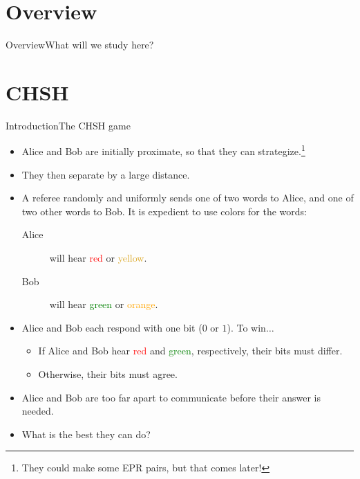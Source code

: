 
\section*{Overview}

\begin{frame}{Overview}{What will we study here?}
\end{frame}

\section*{CHSH}

{%
\def\RD#1{\textcolor{red}{#1}}
\def\YL#1{\textcolor{Goldenrod}{#1}}
\def\GN#1{\textcolor{green}{#1}}
\def\OR#1{\textcolor{orange}{#1}}
\begin{frame}{Introduction}{The CHSH game}
    \begin{itemize}[<+->]
        \item Alice and Bob are initially proximate, so that they can strategize.\footnote{They could make some EPR pairs, but that comes later!}
        \item They then separate by a large distance.
        \item A referee randomly and uniformly sends one of two words to Alice, and one of two other words to Bob.  It is expedient to use colors for the words:
        \begin{description}
            \item[Alice] will hear \RD{red} or \YL{yellow}.
            \item[Bob] will hear \GN{green} or \OR{orange}.
        \end{description}
    \item Alice and Bob each respond with one bit ($0$ or $1$).  To win$\ldots$
    \begin{itemize}
        \item If Alice and Bob hear \RD{red} and \GN{green}, respectively, their bits must differ.
        \item Otherwise, their bits must agree.
    \end{itemize}
    \item Alice and Bob are too far apart to communicate before their answer is needed.
    \item What is the best they can do?
    \end{itemize}
\end{frame}%

}
